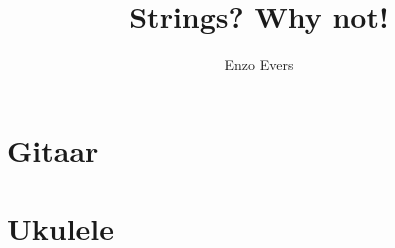\documentclass{book}
\title{Strings? Why not!}
\author{Enzo Evers}
\begin{document}
\maketitle

\tableofcontents

\part{Gitaar}

\newpage

\newpage

\part{Ukulele}

\newpage

\newpage


\printbibliography
\end{document}
